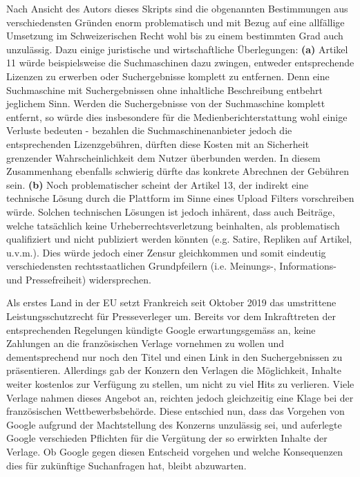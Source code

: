 \documentclass[a4paper,pointlessnumbers]{scrreprt}
\begin{document}
Nach Ansicht des Autors dieses Skripts sind die obgenannten Bestimmungen aus verschiedensten Gründen enorm problematisch und mit Bezug auf eine allfällige Umsetzung im Schweizerischen Recht wohl bis zu einem bestimmten Grad auch unzulässig. Dazu einige juristische und wirtschaftliche Überlegungen: \textbf{(a)} Artikel 11 würde beispielsweise die Suchmaschinen dazu zwingen, entweder entsprechende Lizenzen zu erwerben oder Suchergebnisse komplett zu entfernen. Denn eine Suchmaschine mit Suchergebnissen ohne inhaltliche Beschreibung entbehrt jeglichem Sinn. Werden die Suchergebnisse von der Suchmaschine komplett entfernt, so würde dies insbesondere für die Medienberichterstattung wohl einige Verluste bedeuten - bezahlen die Suchmaschinenanbieter jedoch die entsprechenden Lizenzgebühren, dürften diese Kosten mit an Sicherheit grenzender Wahrscheinlichkeit dem Nutzer überbunden werden. In diesem Zusammenhang ebenfalls schwierig dürfte das konkrete Abrechnen der Gebühren sein. \textbf{(b)} Noch problematischer scheint der Artikel 13, der indirekt eine technische Lösung durch die Plattform im Sinne eines Upload Filters vorschreiben würde. Solchen technischen Lösungen ist jedoch inhärent, dass auch Beiträge, welche tatsächlich keine Urheberrechtsverletzung beinhalten, als problematisch qualifiziert und nicht publiziert werden könnten (e.g. Satire, Repliken auf Artikel, u.v.m.). Dies würde jedoch einer Zensur gleichkommen und somit eindeutig verschiedensten rechtsstaatlichen Grundpfeilern (i.e. Meinungs-, Informations- und Pressefreiheit) widersprechen.

Als erstes Land in der EU setzt Frankreich seit Oktober 2019 das umstrittene Leistungsschutzrecht für Presseverleger um. Bereits vor dem Inkrafttreten der entsprechenden Regelungen kündigte Google erwartungsgemäss an, keine Zahlungen an die französischen Verlage vornehmen zu wollen und dementsprechend nur noch den Titel und einen Link in den Suchergebnissen zu präsentieren. Allerdings gab der Konzern den Verlagen die Möglichkeit, Inhalte weiter kostenlos zur Verfügung zu stellen, um nicht zu viel Hits zu verlieren. Viele Verlage nahmen dieses Angebot an, reichten jedoch gleichzeitig eine Klage bei der französischen Wettbewerbsbehörde. Diese entschied nun, dass das Vorgehen von Google aufgrund der Machtstellung des Konzerns unzulässig sei, und auferlegte Google verschieden Pflichten für die Vergütung der so erwirkten Inhalte der Verlage. Ob Google gegen diesen Entscheid vorgehen und welche Konsequenzen dies für zukünftige Suchanfragen hat, bleibt abzuwarten.
\end{document}
